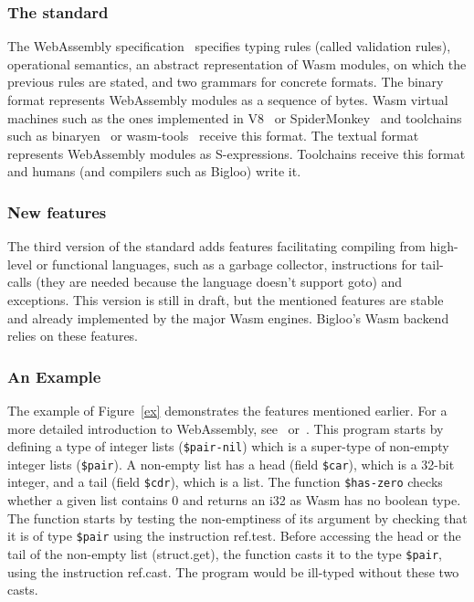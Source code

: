 \documentclass[a4paper,11pt]{article}
\begin{document}
\subsubsection{The standard}
The WebAssembly specification~\cite{WebAssemblyCoreSpecification3} specifies
typing rules (called validation rules), operational semantics, an abstract
representation of Wasm modules, on which the previous rules are stated, and two
grammars for concrete formats. The binary format represents WebAssembly modules
as a sequence of bytes. Wasm virtual machines such as the ones implemented in
V8~\cite{V8} or SpiderMonkey~\cite{SpiderMonkey} and toolchains such as
binaryen~\cite{Binaryen} or wasm-tools~\cite{WasmTools} receive this format. The
textual format represents WebAssembly modules as S-expressions. Toolchains
receive this format and humans (and compilers such as Bigloo) write it.

\subsubsection{New features}
The third version of the standard adds features facilitating compiling from
high-level or functional languages, such as a garbage collector, instructions
for tail-calls (they are needed because the language doesn't support goto) and
exceptions. This version is still in draft, but the mentioned features are
stable and already implemented by the major Wasm engines. Bigloo's Wasm backend
relies on these features.

\subsubsection{An Example}
The example of Figure~\ref{ex} demonstrates the features mentioned earlier. For
a more detailed introduction to WebAssembly,
see~\cite[Section~2.1]{phipps2023continuing} or~\cite{haas2017bringing}. This
program starts by defining a type of integer lists (\texttt{\$pair-nil}) which
is a super-type of non-empty integer lists (\texttt{\$pair}). A non-empty list
has a head (field \texttt{\$car}), which is a 32-bit integer, and a tail (field
\texttt{\$cdr}), which is a list. The function \texttt{\$has-zero} checks
whether a given list contains 0 and returns an \textsf{i32} as Wasm has no
boolean type. The function starts by testing the non-emptiness of its argument
by checking that it is of type \texttt{\$pair} using the instruction
\textsf{ref.test}. Before accessing the head or the tail of the non-empty list
(\textsf{struct.get}), the function casts it to the type \texttt{\$pair}, using
the instruction \textsf{ref.cast}. The program would be ill-typed without these
two casts.
\end{document}
